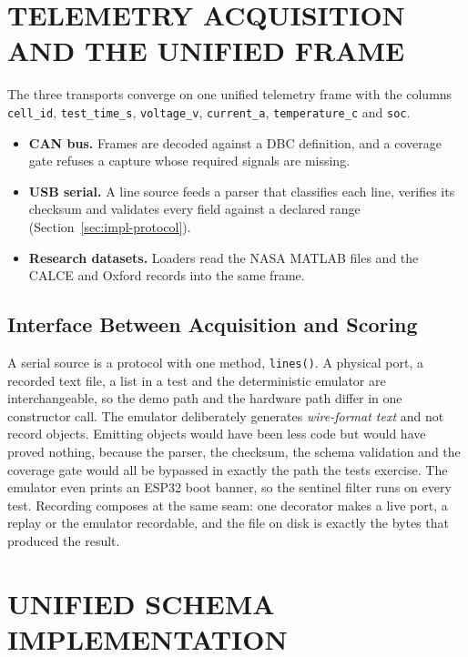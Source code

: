 \section{TELEMETRY ACQUISITION AND THE UNIFIED FRAME}
\label{sec:impl-transports}

The three transports converge on one unified telemetry frame with the columns \texttt{cell\_id}, \texttt{test\_time\_s}, \texttt{voltage\_v}, \texttt{current\_a}, \texttt{temperature\_c} and \texttt{soc}.

\begin{itemize}
    \item \textbf{CAN bus.} Frames are decoded against a DBC definition, and a coverage gate refuses a capture whose required signals are missing.
    \item \textbf{USB serial.} A line source feeds a parser that classifies each line, verifies its checksum and validates every field against a declared range (Section~\ref{sec:impl-protocol}).
    \item \textbf{Research datasets.} Loaders read the NASA MATLAB files and the CALCE and Oxford records into the same frame.
\end{itemize}

\subsection{Interface Between Acquisition and Scoring}

A serial source is a protocol with one method, \texttt{lines()}. A physical port, a recorded text file, a list in a test and the deterministic emulator are interchangeable, so the demo path and the hardware path differ in one constructor call. The emulator deliberately generates \emph{wire-format text} and not record objects. Emitting objects would have been less code but would have proved nothing, because the parser, the checksum, the schema validation and the coverage gate would all be bypassed in exactly the path the tests exercise. The emulator even prints an ESP32 boot banner, so the sentinel filter runs on every test. Recording composes at the same seam: one decorator makes a live port, a replay or the emulator recordable, and the file on disk is exactly the bytes that produced the result.

\section{UNIFIED SCHEMA IMPLEMENTATION}

